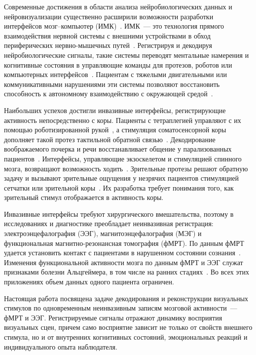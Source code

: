 Современные достижения в области анализа нейробиологических данных и нейровизуализации существенно расширили возможности разработки интерфейсов мозг--компьютер (ИМК)~\cite{wolpaw2000brain, makeig2004mining}. ИМК~--- это технология прямого взаимодействия нервной системы с внешними устройствами в обход периферических нервно-мышечных путей~\cite{mcfarland2002brain}. Регистрируя и декодируя нейробиологические сигналы, такие системы переводят ментальные намерения и когнитивные состояния в управляющие команды для протезов, роботов или компьютерных интерфейсов~\cite{song2020assistive, cruz2021self}. Пациентам с тяжелыми двигательными или коммуникативными нарушениями эти системы позволяют восстановить способность к автономному взаимодействию с окружающей средой~\cite{schwarz2020decoding}.

Наибольших успехов достигли инвазивные интерфейсы, регистрирующие активность непосредственно с коры. Пациенты с тетраплегией управляют с их помощью роботизированной рукой~\cite{hochberg2012reach, collinger2013high}, а стимуляция соматосенсорной коры дополняет такой протез тактильной обратной связью~\cite{flesher2021brain}. Декодирование воображаемого почерка и речи восстанавливает общение у парализованных пациентов~\cite{willett2021high, moses2021neuroprosthesis, willett2023high}. Интерфейсы, управляющие экзоскелетом и стимуляцией спинного мозга, возвращают возможность ходить~\cite{benabid2019exoskeleton, lorach2023walking}. Зрительные протезы решают обратную задачу и вызывают зрительные ощущения у незрячих пациентов стимуляцией сетчатки или зрительной коры~\cite{humayun2012interim, fernandez2021visual}. Их разработка требует понимания того, как зрительный стимул отображается в активность коры.

Инвазивные интерфейсы требуют хирургического вмешательства, поэтому в исследованиях и диагностике преобладает неинвазивная регистрация: электроэнцефалография (ЭЭГ), магнитоэнцефалография (МЭГ) и функциональная магнитно-резонансная томография (фМРТ). По данным фМРТ удается установить контакт с пациентами в нарушенном состоянии сознания~\cite{monti2010willful}. Изменения функциональной активности мозга по данным фМРТ и ЭЭГ служат признаками болезни Альцгеймера, в том числе на ранних стадиях~\cite{greicius2004default, cassani2018systematic, rathore2017review}. Во всех этих приложениях объем данных одного пациента ограничен.

Настоящая работа посвящена задаче декодирования и реконструкции визуальных стимулов по одновременным неинвазивным записям мозговой активности~--- фМРТ и ЭЭГ. Регистрируемые сигналы отражают динамику восприятия визуальных сцен, причем само восприятие зависит не только от свойств внешнего стимула, но и от внутренних когнитивных состояний, эмоциональных реакций и индивидуального опыта наблюдателя.

